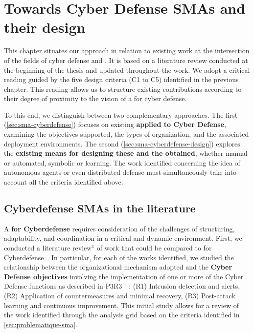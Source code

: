 \clearpage
\thispagestyle{empty}
\null
\newpage

\chapter{Towards Cyber Defense SMAs and their design}

% 

\noindent
This chapter situates our approach in relation to existing work at the intersection of the fields of cyber defense and . It is based on a literature review conducted at the beginning of the thesis and updated throughout the work.
%
We adopt a critical reading guided by the five design criteria (C1 to C5) identified in the previous chapter. This reading allows us to structure existing contributions according to their degree of proximity to the vision of a  for cyber defense.

To this end, we distinguish between two complementary approaches. The first (\autoref{sec:sma-cyberdefense}) focuses on existing \textbf{ applied to Cyber Defense}, examining the objectives supported, the types of organization, and the associated deployment environments. The second (\autoref{sec:sma-cyberdefense-design}) explores the \textbf{existing means for designing these  and the  obtained}, whether manual or automated, symbolic or learning.
%
The work identified concerning the idea of autonomous agents or even distributed defense must simultaneously take into account all the criteria identified above.


\section{Cyberdefense SMAs in the literature}\label{sec:sma-cyberdefense}

A \textbf{ for Cyberdefense} requires consideration of the challenges of structuring, adaptability, and coordination in a critical and dynamic environment.
First, we conducted a literature review$^{1}$ of work that could be compared to  for Cyberdefense~\cite{soule2023ressithese}.
In particular, for each of the works identified, we studied the relationship between the organizational mechanism adopted and the \textbf{Cyber Defense objectives} involving the implementation of one or more of the Cyber Defense functions as described in P3R3~\cite{Theron2013P3R3}~:
(R1) Intrusion detection and alerts,
(R2) Application of countermeasures and minimal recovery,
(R3) Post-attack learning and continuous improvement.
This initial study allows for a review of the work identified through the analysis grid based on the criteria identified in \autoref{sec:problematique-sma}.

